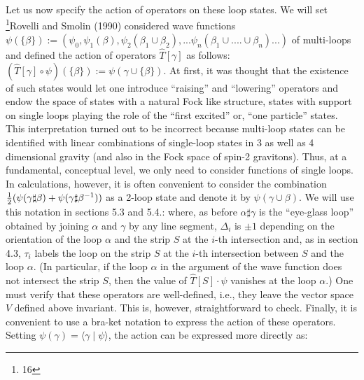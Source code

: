 Let us now specify the action of operators on these loop states. We will
set
\footnote{16}{Rovelli and Smolin (1990) considered wave functions
$\psi(\{\beta\}) := (\psi_0 , \psi_1(\beta), \psi_2(\beta_1\cup\beta_2),
...\psi_n(\beta_1\cup ....\cup\beta_n ) ... )$ of multi-loops and defined
the action of operators $\hat{T}[\gamma]$ as follows: $(\hat{T}[\gamma ]
\circ\psi) (\{\beta\}) := \psi (\gamma\cup\{\beta\})$. At first, it was
thought that the existence of such states would let one introduce
``raising'' and ``lowering'' operators and
endow the space of states with a natural Fock like structure, states with
support on single loops playing the role of the ``first excited'' or,
``one particle'' states. This interpretation turned out to be incorrect
because multi-loop states can be identified with linear combinations of
single-loop states in 3 as well as 4 dimensional gravity (and also in the
Fock space of spin-2 gravitons). Thus, at a fundamental, conceptual level,
we only need to consider functions of single loops. In calculations, however,
it is often convenient to consider the combination $\textstyle{1\over 2}(\psi
(\gamma\sharp\beta)+ \psi (\gamma\sharp\beta^{-1}))$ as a 2-loop state and
denote it by $\psi (\gamma\cup\beta )$. We will use this notation in sections
5.3 and 5.4.}:
where, as before $\alpha\sharp\gamma$ is the ``eye-glass loop'' obtained
by joining $\alpha$ and $\gamma$ by any line segment,
$\Delta_i$ is $\pm 1$ depending on the orientation of the loop
$\alpha$ and the strip $S$ at the $i$-th intersection and, as in section
4.3, $\tau_i$ labels the loop on the strip $S$ at the $i$-th intersection
between $S$ and the loop $\alpha$. (In particular, if the loop $\alpha$
in the argument of the wave function does not intersect the strip $S$,
then the value of $\hat{T}[S]\cdot \psi$ vanishes at the loop $\alpha$.)
One must verify that these operators are well-defined, i.e., they leave
the vector space $V$ defined above invariant. This is, however,
straightforward to check. Finally, it is convenient to use a bra-ket notation
to express the action of these operators. Setting $\psi(\gamma ) =\langle
\gamma\mid \psi \rangle$, the action can be expressed more directly as:
